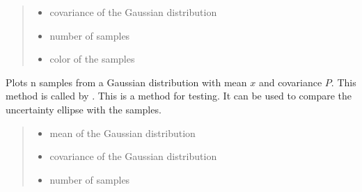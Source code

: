 \documentclass[letterpaper,10pt,english]{sphinxmanual}
\begin{document}
\begin{fulllineitems}
\begin{fulllineitems}
\begin{quote}
\begin{description}
\begin{itemize}
\item {} 
\sphinxAtStartPar
{} \textendash{} covariance of the Gaussian distribution

\item {} 
\sphinxAtStartPar
{} \textendash{} number of samples

\item {} 
\sphinxAtStartPar
{} \textendash{} color of the samples

\end{itemize}

\end{description}\end{quote}

\end{fulllineitems}


\begin{fulllineitems}
\label{\detokenize{FEKFMBLocalization:FEKFMBL.FEKFMBL.PlotSample}}
\pysigstartsignatures
{}
\pysigstopsignatures
\sphinxAtStartPar
Plots n samples from a Gaussian distribution with mean \(x\) and covariance \(P\). This method is called by {\hyperref[\detokenize{FEKFMBLocalization:FEKFMBL.FEKFMBL.PlotUncertainty}]{}}.
This is a method for testing. It can be used to compare the uncertainty ellipse with the samples.
\begin{quote}\begin{description}
\begin{itemize}
\item {} 
\sphinxAtStartPar
{} \textendash{} mean of the Gaussian distribution

\item {} 
\sphinxAtStartPar
{} \textendash{} covariance of the Gaussian distribution

\item {} 
\sphinxAtStartPar
{} \textendash{} number of samples


\end{itemize}
\end{description}
\end{quote}
\end{fulllineitems}
\end{fulllineitems}
\end{document}
